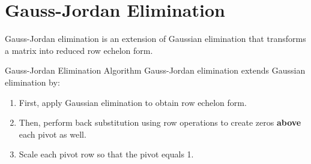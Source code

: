 \documentclass[12pt,a4paper]{article}
\begin{document}
	\section{Gauss-Jordan Elimination}
	
	Gauss-Jordan elimination is an extension of Gaussian elimination that transforms a matrix into reduced row echelon form.
	
	\begin{definition}{Gauss-Jordan Elimination Algorithm}
		Gauss-Jordan elimination extends Gaussian elimination by:
		\begin{enumerate}
			\item First, apply Gaussian elimination to obtain row echelon form.
			\item Then, perform back substitution using row operations to create zeros \textbf{above} each pivot as well.
			\item Scale each pivot row so that the pivot equals 1.
		\end{enumerate}
	\end{definition}
	
\end{document}
